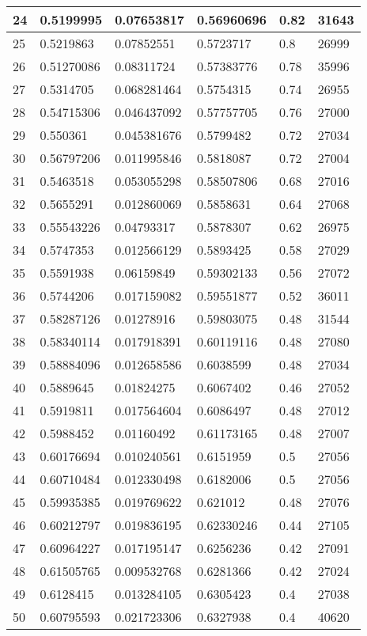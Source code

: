 \begin{longtable}{|l|l|l|l|l|l|}
24 & 0.5199995 & 0.07653817 & 0.56960696 & 0.82 & 31643 \\ \hline 
25 & 0.5219863 & 0.07852551 & 0.5723717 & 0.8 & 26999 \\ \hline 
26 & 0.51270086 & 0.08311724 & 0.57383776 & 0.78 & 35996 \\ \hline 
27 & 0.5314705 & 0.068281464 & 0.5754315 & 0.74 & 26955 \\ \hline 
28 & 0.54715306 & 0.046437092 & 0.57757705 & 0.76 & 27000 \\ \hline 
29 & 0.550361 & 0.045381676 & 0.5799482 & 0.72 & 27034 \\ \hline 
30 & 0.56797206 & 0.011995846 & 0.5818087 & 0.72 & 27004 \\ \hline 
31 & 0.5463518 & 0.053055298 & 0.58507806 & 0.68 & 27016 \\ \hline 
32 & 0.5655291 & 0.012860069 & 0.5858631 & 0.64 & 27068 \\ \hline 
33 & 0.55543226 & 0.04793317 & 0.5878307 & 0.62 & 26975 \\ \hline 
34 & 0.5747353 & 0.012566129 & 0.5893425 & 0.58 & 27029 \\ \hline 
35 & 0.5591938 & 0.06159849 & 0.59302133 & 0.56 & 27072 \\ \hline 
36 & 0.5744206 & 0.017159082 & 0.59551877 & 0.52 & 36011 \\ \hline 
37 & 0.58287126 & 0.01278916 & 0.59803075 & 0.48 & 31544 \\ \hline 
38 & 0.58340114 & 0.017918391 & 0.60119116 & 0.48 & 27080 \\ \hline 
39 & 0.58884096 & 0.012658586 & 0.6038599 & 0.48 & 27034 \\ \hline 
40 & 0.5889645 & 0.01824275 & 0.6067402 & 0.46 & 27052 \\ \hline 
41 & 0.5919811 & 0.017564604 & 0.6086497 & 0.48 & 27012 \\ \hline 
42 & 0.5988452 & 0.01160492 & 0.61173165 & 0.48 & 27007 \\ \hline 
43 & 0.60176694 & 0.010240561 & 0.6151959 & 0.5 & 27056 \\ \hline 
44 & 0.60710484 & 0.012330498 & 0.6182006 & 0.5 & 27056 \\ \hline 
45 & 0.59935385 & 0.019769622 & 0.621012 & 0.48 & 27076 \\ \hline 
46 & 0.60212797 & 0.019836195 & 0.62330246 & 0.44 & 27105 \\ \hline 
47 & 0.60964227 & 0.017195147 & 0.6256236 & 0.42 & 27091 \\ \hline 
48 & 0.61505765 & 0.009532768 & 0.6281366 & 0.42 & 27024 \\ \hline 
49 & 0.6128415 & 0.013284105 & 0.6305423 & 0.4 & 27038 \\ \hline 
50 & 0.60795593 & 0.021723306 & 0.6327938 & 0.4 & 40620 \\ \hline 
\end{longtable}